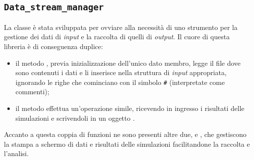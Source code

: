 \subsection{\texttt{Data\_stream\_manager}}
\label{sec:data_stream_manager}
La classe  è stata sviluppata per ovviare alla necessità di uno strumento per la gestione dei dati di \textit{input} e la raccolta di quelli di \textit{output}. Il cuore di questa libreria è di conseguenza duplice:
\begin{itemize}
    \item il metodo , previa inizializzazione dell'unico dato membro, legge il file  dove sono contenuti i dati e li inserisce nella struttura di \textit{input} appropriata, ignorando le righe che cominciano con il simbolo \verb|#| (interpretate come commenti);
    \item il metodo  effettua un'operazione simile, ricevendo in ingresso i risultati delle simulazioni e scrivendoli in un oggetto .
\end{itemize}

Accanto a questa coppia di funzioni ne sono presenti altre due,  e , che gestiscono la stampa a schermo di dati e risultati delle simulazioni facilitandone la raccolta e l'analisi.

